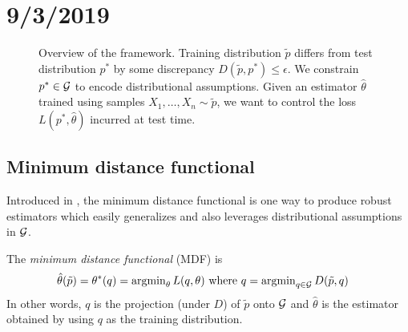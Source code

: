 \section{9/3/2019}

\begin{figure}[H]
    \centerline{
    }
    \label{fig:robust-statistics-framework}
    \caption{Overview of the framework. Training distribution $\tilde{p}$ differs
        from test distribution $p^*$ by some discrepancy $D(\tilde{p}, p^*) \leq \epsilon$.
        We constrain $p^* \in \mathcal{G}$ to encode distributional assumptions.
        Given an estimator $\hat\theta$ trained using samples $X_1, \ldots, X_n \sim \tilde{p}$,
        we want to control the loss $L(p^*, \hat\theta)$ incurred at test time.
    }
\end{figure}


\subsection{Minimum distance functional}

Introduced in \cite{donoho1988automatic}, the minimum distance functional is one way to
produce robust estimators which easily generalizes and also leverages distributional assumptions
in $\mathcal{G}$.

\begin{definition}\label{def:mdf}
    The \emph{minimum distance functional} (MDF) is
    \begin{align}
        \hat\theta(\tilde{p}) &= \theta^*(q) = \operatorname{argmin}_{\theta} L(q, \theta)
        \text{ where }
        q = \operatorname{argmin}_{q \in \mathcal{G}} D(\tilde{p}, q)
    \end{align}
    In other words, $q$ is the projection (under $D$) of $\tilde{p}$ onto $\mathcal{G}$
    and $\hat\theta$ is the estimator obtained by using $q$ as the training distribution.
\end{definition}

